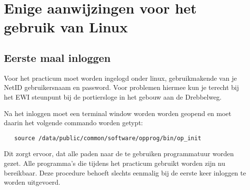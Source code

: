 \section{Enige aanwijzingen voor het gebruik van Linux}
\label{linux}
\subsection{Eerste maal inloggen}
Voor het practicum moet worden ingelogd onder linux,
gebruikmakende van je NetID gebruikersnaam en password.
Voor problemen hiermee kun je terecht bij het EWI steunpunt
bij de portiersloge in het gebouw aan de Drebbelweg.

Na het inloggen moet een terminal window worden worden geopend
en moet daarin het volgende commando worden getypt:
\begin{verbatim}
   source /data/public/common/software/opprog/bin/op_init
\end{verbatim}
Dit zorgt ervoor, dat alle paden naar de te gebruiken
programmatuur worden gezet.
Alle programma's die tijdens het practicum gebruikt worden
zijn nu bereikbaar.
Deze procedure behoeft slechts eenmalig bij de eerste keer inloggen
te worden uitgevoerd.

